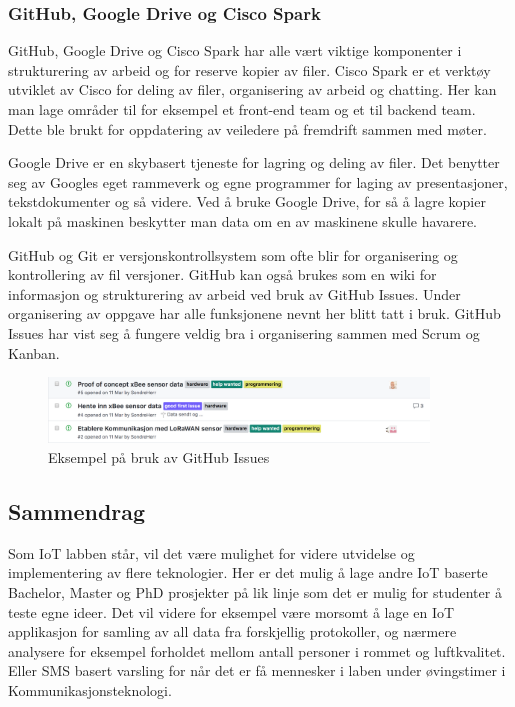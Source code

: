 \documentclass{article}
\begin{document}
\subsubsection{GitHub, Google Drive og Cisco Spark}
GitHub, Google Drive og Cisco Spark har alle vært viktige komponenter i strukturering av arbeid og for reserve kopier av filer. Cisco Spark er et verktøy utviklet av Cisco for deling av filer, organisering av arbeid og chatting. Her kan man lage områder til for eksempel et front-end team og et til backend team. Dette ble brukt for oppdatering av veiledere på fremdrift sammen med møter.

Google Drive er en skybasert tjeneste for lagring og deling av filer. Det benytter seg av Googles eget rammeverk og egne programmer for laging av presentasjoner, tekstdokumenter og så videre. Ved å bruke Google Drive, for så å lagre kopier lokalt på maskinen beskytter man data om en av maskinene skulle havarere.

GitHub og Git er versjonskontrollsystem som ofte blir for organisering og kontrollering av fil versjoner. GitHub kan også brukes som en wiki for informasjon og strukturering av arbeid ved bruk av GitHub Issues. Under organisering av oppgave har alle funksjonene nevnt her blitt tatt i bruk. GitHub Issues har vist seg å fungere veldig bra i organisering sammen med Scrum og Kanban.

\begin{figure}
  \centering
      \includegraphics[width=0.9\textwidth]{GitHubIssues}
  \caption{Eksempel på bruk av GitHub Issues}
\end{figure}

\subsection{Sammendrag}
Som IoT labben står, vil det være mulighet for videre utvidelse og implementering av flere teknologier. Her er det mulig å lage andre IoT baserte Bachelor, Master og PhD prosjekter på lik linje som det er mulig for studenter å teste egne ideer. Det vil videre for eksempel være morsomt å lage en IoT applikasjon for samling av all data fra forskjellig protokoller, og nærmere analysere for eksempel forholdet mellom antall personer i rommet og luftkvalitet. Eller SMS basert varsling for når det er få mennesker i laben under øvingstimer i Kommunikasjonsteknologi. 
\end{document}
